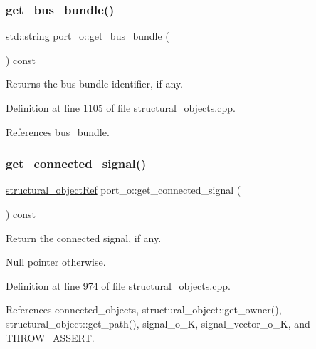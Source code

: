 \subsubsection{\texorpdfstring{get\+\_\+bus\+\_\+bundle()}{get\_bus\_bundle()}}
{\footnotesize\ttfamily std\+::string port\+\_\+o\+::get\+\_\+bus\+\_\+bundle (\begin{DoxyParamCaption}{ }\end{DoxyParamCaption}) const}



Returns the bus bundle identifier, if any. 



Definition at line 1105 of file structural\+\_\+objects.\+cpp.



References bus\+\_\+bundle.

\mbox{\label{structport__o_aa6bb158d117116992b5d19e9af2b59b8}} 
\subsubsection{\texorpdfstring{get\+\_\+connected\+\_\+signal()}{get\_connected\_signal()}}
{\footnotesize\ttfamily \hyperlink{structural__objects_8hpp_a8ea5f8cc50ab8f4c31e2751074ff60b2}{structural\+\_\+object\+Ref} port\+\_\+o\+::get\+\_\+connected\+\_\+signal (\begin{DoxyParamCaption}{ }\end{DoxyParamCaption}) const}



Return the connected signal, if any. 

Null pointer otherwise. 

Definition at line 974 of file structural\+\_\+objects.\+cpp.



References connected\+\_\+objects, structural\+\_\+object\+::get\+\_\+owner(), structural\+\_\+object\+::get\+\_\+path(), signal\+\_\+o\+\_\+K, signal\+\_\+vector\+\_\+o\+\_\+K, and T\+H\+R\+O\+W\+\_\+\+A\+S\+S\+E\+RT.

